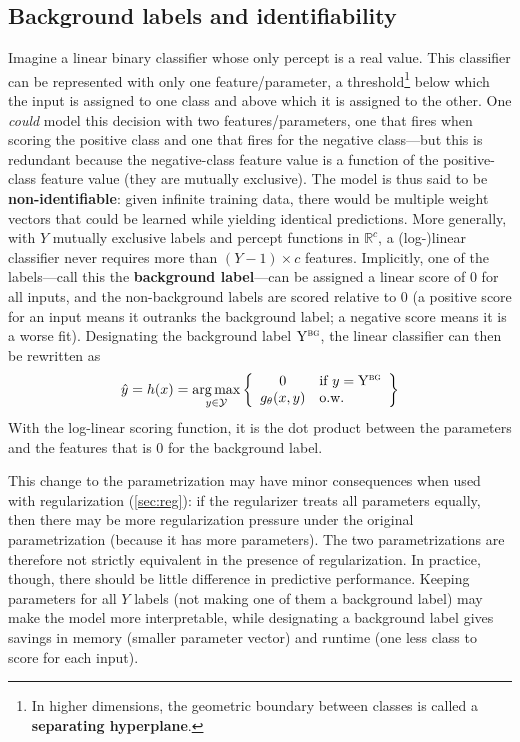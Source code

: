\documentclass[11pt,letterpaper]{article}
\DeclareMathOperator*{\argmax}{arg\,max}
\newcommand{\ensuretext}[1]{#1}
\newcommand{\nssmarker}{\ensuretext{\textcolor{magenta}{\ensuremath{^{\textsc{NS}}_{\textsc{S}}}}}}
\newcommand{\arkcomment}[3]{\ensuretext{\textcolor{#3}{[#1 #2]}}}
\newcommand{\nss}[1]{\arkcomment{\nssmarker}{#1}{magenta}}
\newcommand{\params}{\mathbf{\theta}}
\newcommand{\futureversion}[1]{}
\begin{document}
\subsection{Background labels and identifiability}\label{sec:bg}

Imagine a linear binary classifier whose only percept is a real value. 
This classifier can be represented with only one feature/parameter, a threshold\footnote{In higher dimensions, the geometric boundary between classes is called a {\bf separating hyperplane}.}
below which the input is assigned to one class and above which it is assigned to the other.
One {\em could} model this decision with two features/parameters, one that fires when scoring the positive class 
and one that fires for the negative class---but this is redundant because the negative-class feature value
is a function of the positive-class feature value (they are mutually exclusive).
The model is thus said to be {\bf non-identifiable}: given infinite training data, there would be multiple 
weight vectors that could be learned while yielding identical predictions.
More generally, with $Y$ mutually exclusive labels and percept functions in $\mathbb{R}^c$, a \mbox{(log-)linear} classifier 
never requires more than $(Y-1) \times c$ features. 
Implicitly, one of the labels---call this the {\bf background label}---can be assigned a linear score of 0 for all inputs, 
and the non-background labels are scored relative to 0 (a positive score for an input means it outranks the background label; 
a negative score means it is a worse fit). 
Designating the background label $\mathrm{Y}^{\textsc{bg}}$, the linear classifier can then be rewritten as
\begin{equation}\label{eq:classifier-bg}
\hat{y} = h(x) = \argmax_{y\in\mathcal{Y}} \left\{\begin{array}{cl}
0 & \text{if }y=\mathrm{Y}^{\textsc{bg}} \\
g_\params(x,y) & \text{o.w.}\end{array}\right\}
\end{equation}
With the log-linear scoring function, it is the dot product between the parameters and the features that is 0 for the background label.

This change to the parametrization may have minor consequences when used with regularization (\cref{sec:reg}): 
if the regularizer treats all parameters equally, then there may be more regularization pressure under the original 
parametrization (because it has more parameters). The two parametrizations are therefore not strictly equivalent 
in the presence of regularization.
In practice, though, there should be little difference in predictive performance. 
Keeping parameters for all $Y$ labels (not making one of them a background label) 
may make the model more interpretable\futureversion{\nss{(\cref{sec:interp})}},
while designating a background label gives savings in memory (smaller parameter vector) and runtime (one less class to score for each input).
\end{document}
